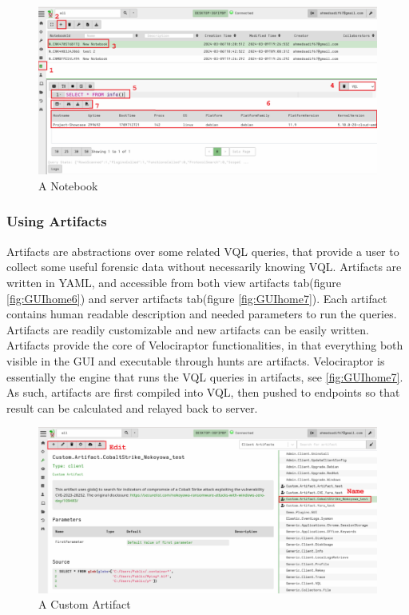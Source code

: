 \documentclass[a4paper, 11pt, oneside]{article} %
\begin{document}
\begin{figure}[ht]
    \centering
    \includegraphics[width=\linewidth, scale=0.5, center]{img/vql/1.png}
    \caption{A Notebook}
    \label{fig:notebook1}
\end{figure}

\subsubsection{Using Artifacts}\label{artifacts}
Artifacts are abstractions over some related VQL queries, that provide a user to collect some useful forensic data without necessarily knowing VQL. Artifacts are written in YAML, and accessible from both view artifacts tab(figure \ref{fig:GUIhome6}) and server artifacts tab(figure \ref{fig:GUIhome7}). Each artifact contains human readable description and needed parameters to run the queries. Artifacts are readily customizable and new artifacts can be easily written.
\\ 
Artifacts provide the core of Velociraptor functionalities, in that everything both visible in the GUI and executable through hunts are artifacts. Velociraptor is essentially the engine that runs the VQL queries in artifacts, see \ref{fig:GUIhome7}. As such, artifacts are first compiled into VQL, then pushed to endpoints so that result can be calculated and relayed back to server.
\begin{figure}[ht]
    \centering
    \includegraphics[width=\linewidth, scale=0.5, center]{img/vql/2.png}
    \caption{A Custom Artifact}
    \label{fig:artifact1}
\end{figure}
\end{document}
